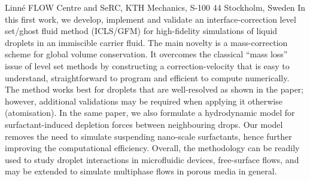 %
%
%
%
%
%
%
\paperaffiliation
{%
  Linn\'e FLOW Centre and SeRC, KTH Mechanics, S-100 44 Stockholm, Sweden%
}%
%
%
%
%
%
\papernumber{}%
%
%
%
%
%
\papersummary%
{%
In this first work, we develop, implement and validate an interface-correction level set/ghost fluid method (ICLS/GFM)
for high-fidelity simulations of liquid droplets in an immiscible carrier fluid.
The main novelty is a mass-correction scheme for global volume conservation.
It overcomes the classical ``mass loss'' issue of level set methods by constructing a correction-velocity that is easy to understand,
straightforward to program and efficient to compute numerically.
The method works best for droplets that are well-resolved as shown in the paper;
however, additional validations may be required when applying it otherwise (\eg atomisation).
In the same paper, we also formulate a hydrodynamic model for surfactant-induced depletion forces between neighbouring drops.
Our model removes the need to simulate suspending nano-scale surfactants, hence further improving the computational efficiency.
Overall, the methodology can be readily used to study droplet interactions in microfluidic devices, free-surface flows,
and may be extended to simulate multiphase flows in porous media in general.
}%
%
\graphicspath{{paper1/}}%
%
%
